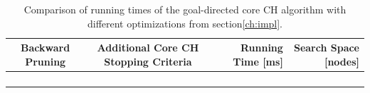 \begin{table}[hbtp]
	\centering
	\begin{tabular}{ccrr}
		\toprule
		Backward Pruning & Additional Core CH Stopping Criteria & Running Time [\si{\milli\second}] & Search Space [nodes] \\
		\midrule
		\xmark           & \xmark                               &                                   &                      \\
		\cmark           & \xmark                               &                                   &                      \\
		\xmark           & \cmark                               &                                   &                      \\
		\cmark           & \cmark                               &                                   &                      \\
		\bottomrule
	\end{tabular}
	\caption{Comparison of running times of the goal-directed core CH algorithm with different optimizations from section\ref{ch:impl}.}
	\label{tbl:opt_runtime}
\end{table}